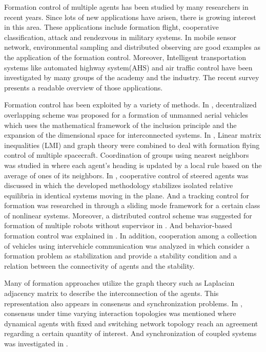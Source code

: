 \documentclass[11pt, a4paper, oneside, openany, reqno]{book}
\theoremstyle{definition}
\theoremstyle{remark}
\numberwithin{equation}{chapter} %
\begin{document}
Formation control of multiple agents has been studied by many researchers in recent years.
Since lots of new applications have arisen, there is growing interest in this area.
These applications include formation flight, 
cooperative classification, attack and rendezvous in military systems.
In mobile sensor network, 
environmental sampling and distributed observing 
are good examples as the application of the formation control.
Moreover, Intelligent transportation systems like automated highway system(AHS) 
and air traffic control have been investigated by many groups of the academy and the industry.
The recent survey \cite{surveycooperativecontrol} presents a readable overview of those applications.

Formation control has been exploited by a variety of methods.
In \cite{overlapping}, decentralized overlapping scheme was proposed 
for a formation of unmanned aerial vehicles which uses the mathematical framework of the inclusion principle
and the expansion of the dimensional space for interconnected systems.
In \cite{mesbahi}, Linear matrix inequalities (LMI) and graph theory were combined to deal with
formation flying control of multiple spacecraft.
Coordination of groups using nearest neighbors was studied in \cite{ali}
where each agent's heading is updated by a local rule based on the average of ones of its neighbors.
In \cite{SPL06}, cooperative control of steered agents was discussed in which the developed methodology
stabilizes isolated relative equilibria in identical systems moving in the plane.
And a tracking control for formation was researched in \cite{hsihan} 
through a sliding mode framework for a certain class of nonlinear systems.
Moreover, a distributed control scheme was suggested for formation of multiple robots without supervisor
in \cite{hiroaki}. And behavior-based formation control was explained in \cite{arkin}.
In addition, cooperation among a collection of vehicles using intervehicle communication
was analyzed in \cite{fax,glaff} which consider a formation problem as stabilization and 
provide a stability condition and a relation between the connectivity of agents and the stability.

Many of formation approaches utilize the graph theory such as 
Laplacian adjacency matrix to describe the interconnection of the agents.
This representation also appears in consensus and synchronization problems.
In \cite{weiren, weiren2, reza}, consensus under time varying interaction topologies was mentioned
where dynamical agents with fixed and switching network topology reach 
an agreement regarding a certain quantity of interest.
And synchronization of coupled systems was investigated in \cite{cww,cww2,amano,lucmoreau}.
\end{document}
